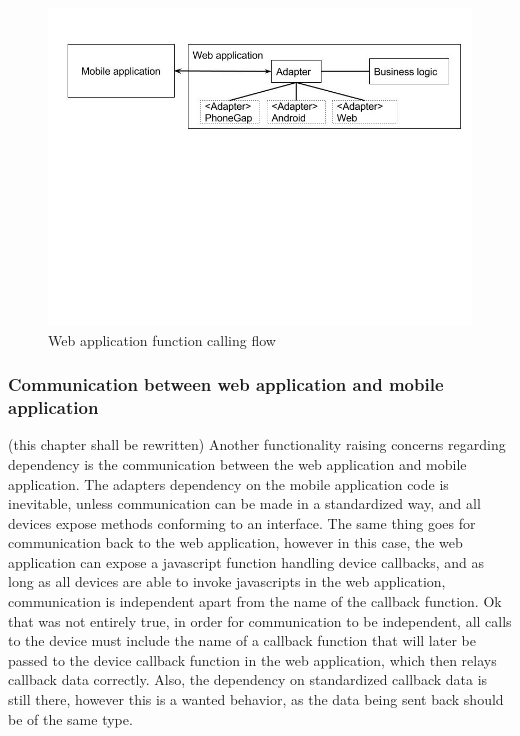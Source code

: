 \begin{figure}[ht!]
    \centering
    \includegraphics[width=140mm,natwidth=800,natheight=600]{./img/webAppFlow.jpg}
    \caption{Web application function calling flow \label{caption-web-flow}}
\end{figure}

\subsubsection{Communication between web application and mobile application}
(this chapter shall be rewritten)
Another functionality raising concerns regarding dependency is the communication between the web application and mobile application. The adapters dependency on the mobile application code is inevitable, unless communication can be made in a standardized way, and all devices expose methods conforming to an interface. The same thing goes for communication back to the web application, however in this case, the web application can expose a javascript function handling device callbacks, and as long as all devices are able to invoke javascripts in the web application, communication is independent apart from the name of the callback function. Ok that was not entirely true, in order for communication to be independent, all calls to the device must include the name of a callback function that will later be passed to the device callback function in the web application, which then relays callback data correctly. Also, the dependency on standardized callback data is still there, however this is a wanted behavior, as the data being sent back should be of the same type.


